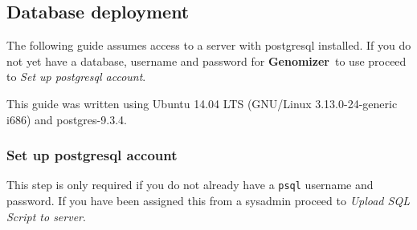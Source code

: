 \documentclass[a4paper]{report}
\newcommand{\appName}{\textbf{Genomizer}}
\begin{document}
  \subsection{Database deployment}
    The following guide assumes access to a server with postgresql installed. If you do not yet have a database, username and password for \appName\ to use proceed to \emph{Set up postgresql account}.

    This guide was written using Ubuntu 14.04 LTS (GNU/Linux 3.13.0-24-generic i686) and postgres-9.3.4.

    \subsubsection{Set up postgresql account}
      This step is only required if you do not already have a \texttt{psql} username and password. If you have been assigned this from a sysadmin proceed to \emph{Upload SQL Script to server}.
\end{document}
